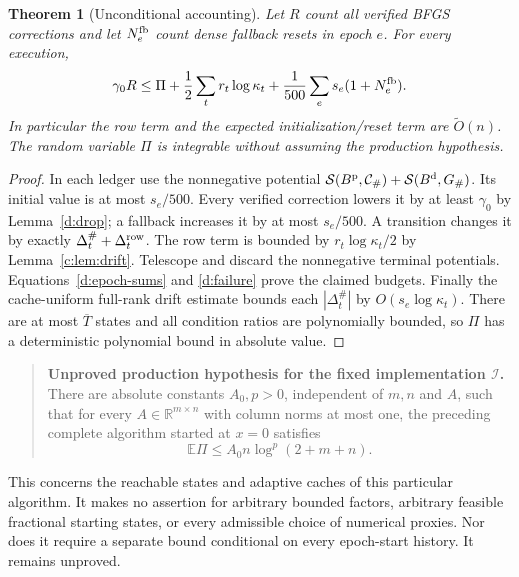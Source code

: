 \documentclass[11pt]{amsart}
\newtheorem{theorem}{Theorem}[section]
\theoremstyle{definition}\newtheorem{definition}[theorem]{Definition}
\theoremstyle{remark}\newtheorem{remark}[theorem]{Remark}
\numberwithin{equation}{section}
\begin{document}
\begin{theorem}[Unconditional accounting]\label{d:accounting}
Let $R$ count all verified BFGS corrections and let $N_e^{\rm fb}$ count
dense fallback resets in epoch $e$. For every execution,
\begin{equation}\label{d:account}
 \gamma_0 R\le
 \Pi+\frac12\sum_t r_t\log\kappa_t
       +\frac1{500}\sum_e s_e(1+N_e^{\rm fb}).
\end{equation}
In particular the row term and the expected initialization/reset term
are $\widetilde O(n)$. The random variable $\Pi$ is integrable without
assuming the production hypothesis.
\end{theorem}
\begin{proof}
In each ledger use the nonnegative potential
$\mathcal S(B^{\rm p},\mathcal C_\#)+\mathcal S(B^{\rm d},G_\#)$.
Its initial value is at most $s_e/500$. Every verified correction lowers
it by at least $\gamma_0$ by Lemma~\ref{d:drop}; a fallback increases it
by at most $s_e/500$. A transition changes it by exactly
$\Delta_t^\#+\Delta_t^{\rm row}$. The row term is bounded by
$r_t\log\kappa_t/2$ by Lemma~\ref{c:lem:drift}. Telescope and discard
the nonnegative terminal potentials. Equations~\eqref{d:epoch-sums} and
\eqref{d:failure} prove the claimed budgets.
Finally the cache-uniform full-rank drift estimate bounds each
$|\Delta_t^\#|$ by $O(s_e\log\kappa_t)$. There are at most
$\overline T$ states and all condition ratios are polynomially bounded,
so $\Pi$ has a deterministic polynomial bound in absolute value.
\end{proof}

\begin{quote}
\textbf{Unproved production hypothesis for the fixed implementation $\mathcal I$.}
There are absolute constants $A_0,p>0$, independent of $m,n$ and $A$,
such that for every $A\in\mathbb R^{m\times n}$ with column norms at
most one, the preceding complete algorithm started at $x=0$ satisfies
\begin{equation}\label{d:conjecture}
 \mathbb E\Pi\le A_0 n\log^p(2+m+n).
\end{equation}
\end{quote}
This concerns the reachable states and adaptive caches of this particular
algorithm. It makes no assertion for arbitrary bounded factors,
arbitrary feasible fractional starting states, or every admissible
choice of numerical proxies. Nor does it require a separate bound
conditional on every epoch-start history. It remains unproved.
\end{document}
